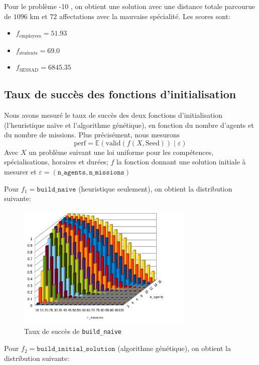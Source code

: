 \documentclass[11pt]{article}
\begin{document}
Pour le problème -10 \fg, on obtient une solution avec une distance totale parcourue de $1096$ km et $72$ affectations avec la mauvaise spécialité.
Les scores sont:

\begin{itemize}
    \item $f_{\text{employees}} = 51.93$
    \item $f_{\text{students}} = 69.0$
    \item $f_{\text{SESSAD}} = 6845.35$
\end{itemize}

\subsection{Taux de succès des fonctions d'initialisation}

Nous avons mesuré le taux de succès des deux fonctions d'initialisation (l'heuristique \og naïve \fg et l'algorithme génétique), en fonction du nombre d'agents et du nombre de missions.
Plus précisément, nous mesurons
$$
\text{perf} = \mathbb{E}(\text{valid}(f(X, \text{Seed})) \;\vert\; \varepsilon)
$$
Avec $X$ un problème suivant une loi uniforme pour les compétences, spécialisations, horaires et durées; $f$ la fonction donnant une solution initiale à mesurer et $\varepsilon = (\texttt{n\_agents}, \texttt{n\_missions})$

Pour $f_1 = \texttt{build\_naive}$ (heuristique seulement), on obtient la distribution suivante:

\begin{figure}[H]
    \centering
    \includegraphics[width=0.75\textwidth]{Images/naive.png}
    \caption{Taux de succès de \texttt{build\_naive}}
    \label{fig:naive_success}
\end{figure}

Pour $f_2 = \texttt{build\_initial\_solution}$ (algorithme génétique), on obtient la distribution suivante:
\end{document}

